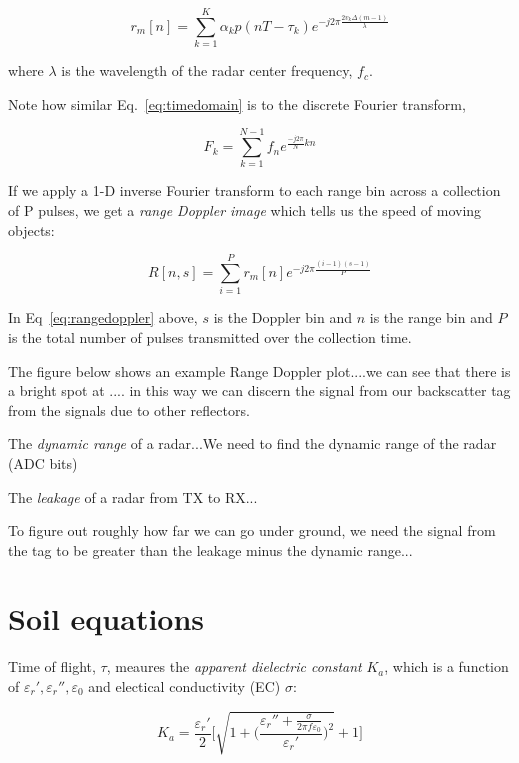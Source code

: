 \documentclass[12pt]{article}
\begin{document}
\begin{equation}
r_m[n] =  \sum\limits_{k=1}^K \alpha_k p(nT - \tau_k)e^{-j2\pi  \frac{2 v_k \Delta(m-1)}{\lambda}}  
\label{eq:timedomain}
\end{equation}

where $\lambda$ is the wavelength of the radar center frequency,
$f_c$.

Note how similar Eq.~\ref{eq:timedomain} is to the discrete Fourier transform,

\begin{equation}
F_k = \sum\limits_{k=1}^{N-1} f_n e^{\frac{-j2\pi}{N}kn}
\end{equation}

If we apply a 1-D inverse Fourier transform to each range bin across a
collection of P pulses, we get a \emph{range Doppler image} which
tells us the speed of moving objects:

\begin{equation}
R[n,s] = \sum\limits_{i=1}^{P} r_m[n] e^{-j2\pi\frac{(i-1)(s-1)}{P}}

\label{eq:rangedoppler}\end{equation}

In Eq~\ref{eq:rangedoppler} above, $s$ is the Doppler bin and $n$ is
the range bin and $P$ is the total number of pulses transmitted over
the collection time. 

The figure below shows an example Range Doppler plot....we can see
that there is a bright spot at .... in this way we can discern the
signal from our backscatter tag from the signals due to other
reflectors.

The \emph{dynamic range} of a radar...We need to find the dynamic
range of the radar (ADC bits)

The \emph{leakage} of a radar from TX to RX...

To figure out roughly how far we can go under ground, we need the
signal from the tag to be greater than the leakage minus the dynamic
range...


\section*{Soil equations}
Time of flight, $\tau$, meaures the \emph{apparent dielectric
  constant} $K_a$, which is a function of
$\varepsilon_r', \varepsilon_r'', \varepsilon_0$ and electical conductivity (EC)
$\sigma$:

\begin{equation}
  K_a = \frac{\varepsilon_r'}{2}\Bigg[\sqrt{1+\bigg(\frac{\varepsilon_r'' + \frac{\sigma}{2\pi f\varepsilon_0}}{\varepsilon_r'}\bigg)^2}+1\Bigg]  
\end{equation}
\end{document}

